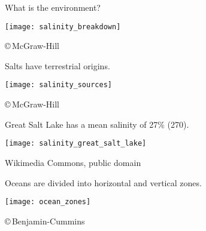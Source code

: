 \documentclass[t]{beamer}
\begin{document}
{
\begin{frame}[t]{What is the  environment?}
\end{frame}
}
\begin{frame}[t]%
	\begin{center}
		\texttt{[image: salinity\_breakdown]}
	\end{center}

	\vfilll

	\hfill \tiny \copyright\,McGraw-Hill
\end{frame}
%
\begin{frame}[t]{Salts have terrestrial origins.}
	\begin{center}
		\texttt{[image: salinity\_sources]}
	\end{center}

	\vfilll

	\hfill \tiny \copyright\,McGraw-Hill
\end{frame}
%
\begin{frame}[t]{Great Salt Lake has a mean salinity of 27\% (270\text{\textperthousand}).}
	\begin{center}
		\texttt{[image: salinity\_great\_salt\_lake]}
	\end{center}

	\tiny Wikimedia Commons, public domain
\end{frame}
%
\begin{frame}[t]{Oceans are divided into horizontal and vertical zones.}
	\begin{center}
		\texttt{[image: ocean\_zones]}
	\end{center}

	\vfilll

	\hfill \tiny \copyright\,Benjamin-Cummins
\end{frame}
%
\end{document}
